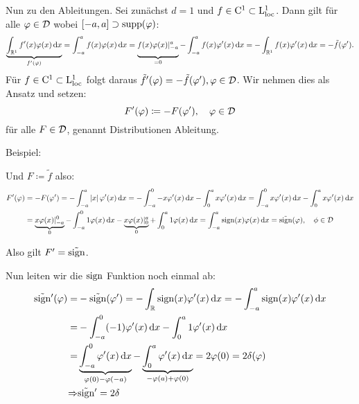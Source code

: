 Nun zu den Ableitungen.
Sei zunächst $d=1$ und $f \in \mathrm{C}^1 \subset \mathrm{L}^1_{\mathrm{loc}}$.
Dann gilt für alle $\varphi \in \mathcal{D}$ wobei $[-a,a] \supset \operatorname{supp}(\varphi)$:
\[
    \underbrace{\int_{\R^1} f'(x) \varphi(x) \d x}_{f'(\varphi)} 
    = \int_{-a}^a f(x) \varphi(x) \d x 
    = \underbrace{\vphantom{\int_{\R^1}} f(x)\varphi(x)|_{-a}^{a}}_{=0} - \int_{-a}^a f(x) \varphi'(x) \d x 
    = -\int_{\R^1} f(x) \varphi'(x) \d x = -\tilde f(\varphi').
\]
Für $f \in \mathrm{C}^1 \subset \mathrm{L}^1_{\mathrm{loc}}$ folgt daraus $\tilde f'(\varphi) = - \tilde f(\varphi'), \varphi \in \mathcal{D}$. Wir nehmen dies als Ansatz und setzen:
\begin{equation}\label{eq.11.2}
    F'(\varphi) \coloneqq -F(\varphi'), \quad\varphi \in \mathcal{D}
\end{equation}
für alle $F\in \mathcal{D}$, genannt Distributionen Ableitung.

Beispiel:
\begin{center}
\end{center}
Und $F \coloneqq \tilde f$ also:
\begin{align*}
F'(\varphi) 
    &= -F(\varphi') 
= - \int_{-a}^a \abs{x} \varphi'(x) \d x 
= - \int_{-a}^0 -x \varphi'(x) \d x - \int_0^a x \varphi'(x) \d x
= \int_{-a}^0 x \varphi'(x) \d x - \int_0^a x \varphi'(x) \d x  \\
    &= \underbrace{x \varphi(x)|_{-a}^0}_{0} - \int_{-a}^0 1 \varphi(x) \d x - \underbrace{x \varphi(x)|_0^a}_{0} + \int_0^a 1 \varphi(x) \d x
= \int_{-a}^a \sign(x) \varphi(x) \d x = \tilde{\sign}(\varphi), \quad \phi \in \D
\end{align*}

\begin{center}
\end{center}
Also gilt $F'=\tilde{\operatorname{sign}}$.

Nun leiten wir die $\operatorname{sign}$ Funktion noch einmal ab:
\begin{align*}
    \tilde{\operatorname{sign}}'(\varphi) 
    =& -\tilde{\operatorname{sign}}(\varphi') 
    = - \int_\mathbb R \operatorname{sign}(x) \varphi'(x) \, {\operatorname{d}\!{x}} 
    = - \int_{-a}^a \operatorname{sign}(x) \varphi'(x) \, {\operatorname{d}\!{x}}\\
    =&- \int_{-a}^0 (-1) \varphi'(x) \, {\operatorname{d}\!{x}} - \int_0^a 1 \varphi'(x)\, {\operatorname{d}\!{x}}\\
    =&\underbrace{\int_{-a}^0 \varphi'(x) \, {\operatorname{d}\!{x}}}_{\varphi(0) - \varphi(-a)} - \underbrace{\int_0^a \varphi'(x)\, {\operatorname{d}\!{x}}}_{-\varphi(a)+\varphi(0)} = 2 \varphi(0) = 2 \delta(\varphi)\\
    \Rightarrow & \tilde{\operatorname{sign}}'=2\delta
\end{align*}

